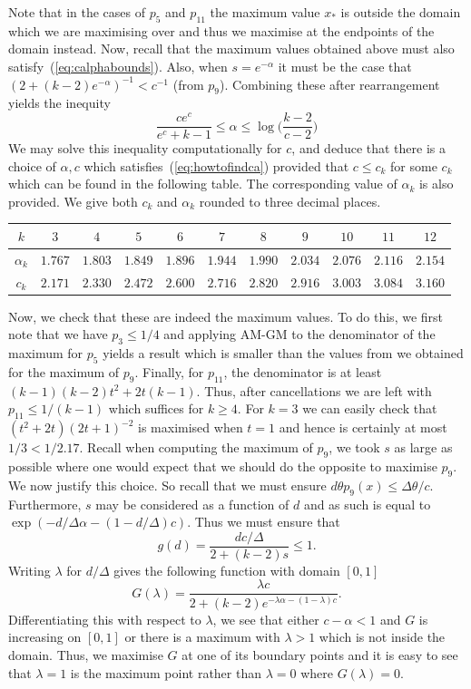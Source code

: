 \documentclass[10pt,a4paper]{article}
\theoremstyle{definition}
\begin{document}
Note that in the cases of $p_5$ and $p_{11}$ the maximum value $x_*$ is outside the domain which we are maximising over and thus we maximise at the endpoints of the domain instead.
%
Now, recall that the maximum values obtained above must also satisfy~(\ref{eq:calphabounds}).
Also, when $s=e^{-\alpha}$ it must be the case that $(2+(k-2)e^{-\alpha})^{-1} <c^{-1}$ (from $p_9$).
Combining these after rearrangement yields the inequity
\begin{equation}
 \frac{ce^c}{e^c+k-1} \leq \alpha \leq \log\bigg(\frac{k-2}{c-2}\bigg)
 \label{eq:howtofindca}
\end{equation}
We may solve this inequality computationally for $c$, and deduce that there is a choice of $\alpha, c$ which satisfies~(\ref{eq:howtofindca}) provided that $c \leq c_k$ for some $c_k$ which can be found in the following table.
The corresponding value of $\alpha_k$ is also provided.
We give both $c_k$ and $\alpha_k$ rounded to three decimal places.
%
\begin{center}
 \begin{tabular}{c||c|c|c|c|c|c|c|c|c|c}  $k$ & $3$ & $4$ & $5$ & $6$ & $7$ & $8$ & $9$ & $10$ & $11$ & $12$ \\
 \hline
  $\alpha_k$ & $1.767$ & $1.803$ & $1.849$ & $1.896$ & $1.944$ & $1.990$ & $2.034$ & $2.076$ & $2.116$ & $2.154$ \\  \hline
  $c_k$ & $2.171$ & $2.330$ & $2.472$ & $2.600$ & $2.716$ & $2.820$ & $2.916$ & $3.003$ & $3.084$ & $3.160$ \\
 \end{tabular}
\end{center}
%
Now, we check that these are indeed the maximum values. To do this, we first note that we have $p_3 \leq 1/4$ and applying AM-GM to the denominator of the maximum for $p_5$ yields a result which is smaller than the values from we obtained for the maximum of $p_9$.
Finally, for $p_{11}$, the denominator is at least $(k-1)(k-2) t^2 +2t(k-1)$. Thus, after cancellations we are left with $p_{11} \leq 1/(k-1)$ which suffices for $k \geq 4$.
For $k=3$ we can easily check that $(t^2+2t)(2t+1)^{-2}$ is maximised when $t=1$ and hence is certainly at most $1/3 < 1/2.17$.
%
Recall when computing the maximum of $p_9$, we took $s$ as large as possible where one would expect that we should do the opposite to maximise $p_9$.
We now justify this choice.
So recall that we must ensure $d\theta p_9(x) \leq \Delta \theta/c$.
Furthermore, $s$ may be considered as a function of $d$ and as such is equal to $\exp(-d/\Delta \alpha - (1-d/\Delta)c)$.
Thus we must ensure that
$$
g(d)=\frac{dc/\Delta}{2+(k-2)s} \leq 1.
$$
Writing $\lambda$ for $d/\Delta$ gives the following function with domain $[0,1]$
$$
G(\lambda)=\frac{\lambda c}{2+(k-2)e^{-\lambda \alpha -(1-\lambda)c}}.
$$
Differentiating this with respect to $\lambda$, we see that either $c-\alpha<1$ and $G$ is increasing on $[0,1]$ or there is a maximum with $\lambda >1$ which is not inside the domain.
Thus, we maximise $G$ at one of its boundary points and it is easy to see that $\lambda=1$ is the maximum point rather than $\lambda =0$ where $G(\lambda)=0$.
%
%
%
\end{document}
